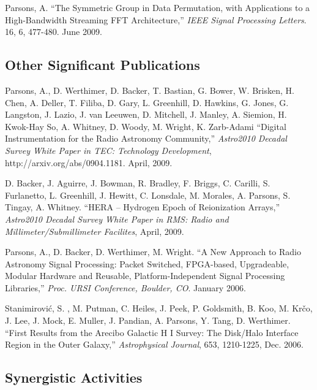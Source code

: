 \documentclass[apjpt4]{aastex}
\begin{document}
Parsons, A.
``The Symmetric Group in Data Permutation, with Applications to
a High-Bandwidth Streaming FFT Architecture,''
{\it IEEE Signal Processing Letters}.
16, 6, 477-480. June 2009.

\subsection*{Other Significant Publications}
\vspace{-8pt}

Parsons, A., D. Werthimer, D. Backer, T. Bastian, G. Bower, W. Brisken, H. Chen, A. Deller, T. Filiba, D. Gary, L. Greenhill, D. Hawkins, G. Jones, G. Langston, J. Lazio, J. van Leeuwen, D. Mitchell, J. Manley, A. Siemion, H. Kwok-Hay So, A. Whitney, D. Woody, M. Wright, K. Zarb-Adami
``Digital Instrumentation for the Radio Astronomy Community,''
{\it Astro2010 Decadal Survey White Paper in TEC: Technology Development},
http://arxiv.org/abs/0904.1181. April, 2009.

D. Backer, J. Aguirre, J. Bowman, R. Bradley, F. Briggs,
C. Carilli, S. Furlanetto, L. Greenhill, J. Hewitt,
C. Lonsdale, M. Morales, A. Parsons, S. Tingay, A. Whitney.
``HERA – Hydrogen Epoch of Reionization Arrays,''
{\it Astro2010 Decadal Survey White Paper in RMS: Radio and Millimeter/Submillimeter Facilites}, April, 2009.

Parsons, A., D. Backer, D. Werthimer, M. Wright.
``A New Approach to Radio Astronomy Signal Processing: Packet Switched, 
FPGA-based, Upgradeable, Modular Hardware and Reusable, Platform-Independent 
Signal Processing Libraries,'' 
{\it Proc. URSI Conference, Boulder, CO}.
January 2006.

Stanimirovi{\'c}, S. , M. Putman, C. Heiles, J. Peek, P. Goldsmith, B. Koo,
M. Kr{\v c}o, J. Lee, J. Mock, E. Muller, J. Pandian, A. Parsons, Y. Tang, D. Werthimer.
``First Results from the Arecibo Galactic H I Survey: The Disk/Halo Interface Region in the Outer Galaxy,''
{\it Astrophysical Journal}, 653, 1210-1225, Dec. 2006.

\subsection*{Synergistic Activities}
\vspace{-8pt}

\end{document}
